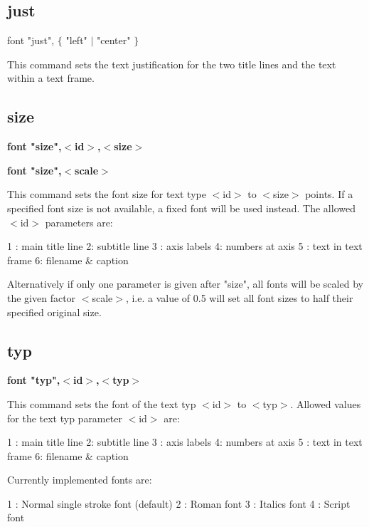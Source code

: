 \subsection*{just}
font "just", $ \{$ "left" $| $ "center" $\} $ 
\par
This command sets the text justification for the two title lines and 
the text within a text frame. 
\subsection*{size}
{\bf font "size",$ <$id$> $,$ <$size$> $ \par }
{\bf font "size",$ <$scale$> $ \par }
\par
\vspace{3pt}
This command sets the font size for text type $ <$id$> $ to $ <$size$> $ points. 
If a specified font size is not available, a fixed font will be used 
instead. The allowed $ <$id$> $ parameters are: 
\par
\begin{MacVerbatim}
  1 : main title line               2: subtitle line
  3 : axis labels                   4: numbers at axis
  5 : text in text frame            6: filename & caption
\end{MacVerbatim}
Alternatively if only one parameter is given after "size", all fonts 
will be scaled by the given factor $ <$scale$> $, i.e. a value of 0.5 will 
set all font sizes to half their specified original size. 
\subsection*{typ}
{\bf font "typ",$ <$id$> $,$ <$typ$> $ \par }
\par
\vspace{3pt}
This command sets the font of the text typ $ <$id$> $ to $ <$typ$> $. Allowed 
values for the text typ parameter $ <$id$> $ are: 
\par
\begin{MacVerbatim}
  1 : main title line               2: subtitle line
  3 : axis labels                   4: numbers at axis
  5 : text in text frame            6: filename & caption
\end{MacVerbatim}
Currently implemented fonts are: 
\par
\begin{MacVerbatim}
  1 : Normal single stroke font (default)
  2 : Roman font
  3 : Italics font
  4 : Script font
\end{MacVerbatim}
